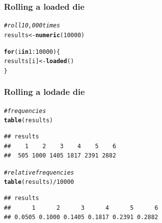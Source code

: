 \documentclass[12pt]{beamer}\usepackage[]{graphicx}\usepackage[]{color}
\makeatletter
\newcommand{\hlnum}[1]{\textcolor[rgb]{0.686,0.059,0.569}{#1}}%
\newcommand{\hlcom}[1]{\textcolor[rgb]{0.678,0.584,0.686}{\textit{#1}}}%
\newcommand{\hlopt}[1]{\textcolor[rgb]{0,0,0}{#1}}%
\newcommand{\hlstd}[1]{\textcolor[rgb]{0.345,0.345,0.345}{#1}}%
\newcommand{\hlkwa}[1]{\textcolor[rgb]{0.161,0.373,0.58}{\textbf{#1}}}%
\newcommand{\hlkwb}[1]{\textcolor[rgb]{0.69,0.353,0.396}{#1}}%
\newcommand{\hlkwd}[1]{\textcolor[rgb]{0.737,0.353,0.396}{\textbf{#1}}}%
\newenvironment{kframe}{%
 \def\at@end@of@kframe{}%
 \ifinner\ifhmode%
  \def\at@end@of@kframe{\end{minipage}}%
  \begin{minipage}{\columnwidth}%
 \fi\fi%
 \def\FrameCommand##1{\hskip\@totalleftmargin \hskip-\fboxsep
 \colorbox{shadecolor}{##1}\hskip-\fboxsep
     \hskip-\linewidth \hskip-\@totalleftmargin \hskip\columnwidth}%
 \MakeFramed {\advance\hsize-\width
   \@totalleftmargin\z@ \linewidth\hsize
   \@setminipage}}%
 {\par\unskip\endMakeFramed%
 \at@end@of@kframe}
\newenvironment{knitrout}{}{} %
\makeatother
\begin{document}

\begin{frame}[fragile]
\frametitle{Rolling a loaded die}
\begin{knitrout}\footnotesize
{}\color{fgcolor}\begin{kframe}
\begin{alltt}
\hlcom{# roll 10,000 times}
\hlstd{results} \hlkwb{<-} \hlkwd{numeric}\hlstd{(}\hlnum{10000}\hlstd{)}

\hlkwa{for} \hlstd{(i} \hlkwa{in} \hlnum{1}\hlopt{:}\hlnum{10000}\hlstd{) \{}
  \hlstd{results[i]} \hlkwb{<-} \hlkwd{loaded}\hlstd{()}
\hlstd{\}}
\end{alltt}
\end{kframe}
\end{knitrout}

\end{frame}


\begin{frame}[fragile]
\frametitle{Rolling a lodade die}
\begin{knitrout}\footnotesize
{}\color{fgcolor}\begin{kframe}
\begin{alltt}
\hlcom{# frequencies}
\hlkwd{table}\hlstd{(results)}
\end{alltt}
\begin{verbatim}
## results
##    1    2    3    4    5    6 
##  505 1000 1405 1817 2391 2882
\end{verbatim}
\begin{alltt}
\hlcom{# relative frequencies}
\hlkwd{table}\hlstd{(results)} \hlopt{/} \hlnum{10000}
\end{alltt}
\begin{verbatim}
## results
##      1      2      3      4      5      6 
## 0.0505 0.1000 0.1405 0.1817 0.2391 0.2882
\end{verbatim}
\end{kframe}
\end{knitrout}

\end{frame}

\end{document}
